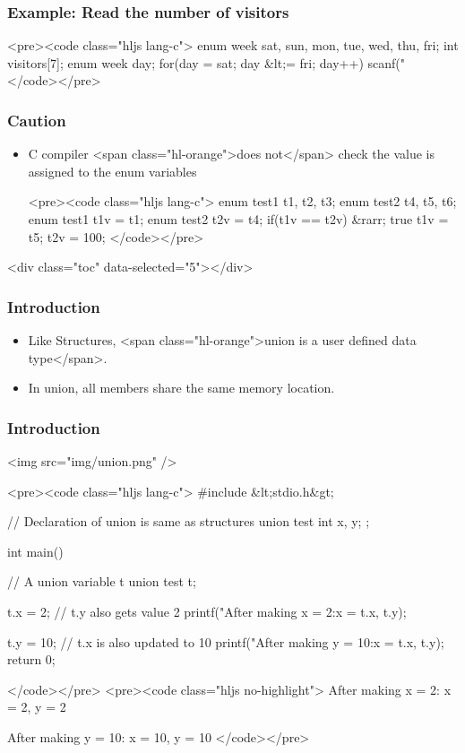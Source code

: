 \documentclass{../c-lecture}
\begin{document}
\begin{frame}
  \frametitle{Example: Read the number of visitors}
  <pre><code class="hljs lang-c">
enum week {sat, sun, mon, tue, wed, thu, fri};
int visitors[7];
enum week day;
for(day = sat; day &lt;= fri; day++)
  scanf("%
  </code></pre>
\end{frame}
\begin{frame}
  \frametitle{Caution}
  \begin{itemize}
    \item
      C compiler <span class="hl-orange">does not</span> check the value is
      assigned to the enum variables

    <pre><code class="hljs lang-c">
enum test1 {t1, t2, t3};
enum test2 {t4, t5, t6};
enum test1 t1v = t1;
enum test2 t2v = t4;
if(t1v == t2v) &rarr; true
t1v = t5;
t2v = 100;
    </code></pre>
  \end{itemize}
\end{frame}
\begin{frame}
  <div class="toc" data-selected="5"></div>
\end{frame}
\begin{frame}
  \frametitle{Introduction}
  \begin{itemize}
    \item
      Like Structures,
      <span class="hl-orange">union is a user defined data type</span>.

    \item In union, all members share the same memory location.
  \end{itemize}
\end{frame}
\begin{frame}
  \frametitle{Introduction}
  <img src="img/union.png" />
\end{frame}
\begin{frame}
  <pre><code class="hljs lang-c">
#include &lt;stdio.h&gt;

// Declaration of union is same as structures
union test {
    int x, y;
};

int main()
{
    // A union variable t
    union test t;

    t.x = 2; // t.y also gets value 2
    printf("After making x = 2:\n x = %
           t.x, t.y);

    t.y = 10; // t.x is also updated to 10
    printf("After making y = 10:\n x = %
           t.x, t.y);
    return 0;
}
  </code></pre>
  <pre><code class="hljs no-highlight">
After making x = 2:
 x = 2, y = 2

After making y = 10:
 x = 10, y = 10
  </code></pre>
\end{frame}
\end{document}
